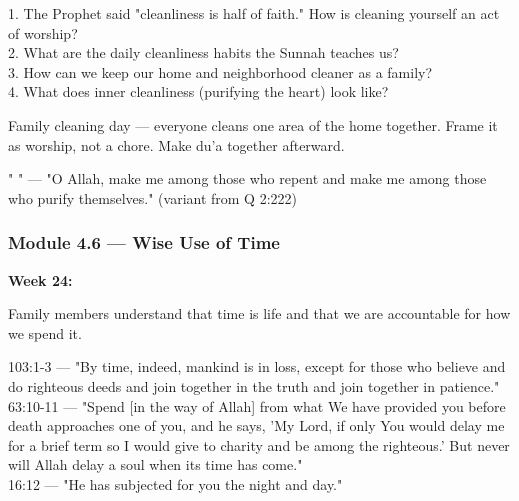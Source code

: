 \documentclass[11pt,a4paper]{article}
\begin{document}
\begin{discussionbox} 1. The Prophet said "cleanliness is half of faith." How is cleaning yourself an act of worship? \\ 2. What are the daily cleanliness habits the Sunnah teaches us? \\ 3. How can we keep our home and neighborhood cleaner as a family? \\ 4. What does inner cleanliness (purifying the heart) look like? \end{discussionbox}

\begin{activitybox} Family cleaning day --- everyone cleans one area of the home together. Frame it as worship, not a chore. Make du'a together afterward. \end{activitybox}

\begin{duabox} "      " --- "O Allah, make me among those who repent and make me among those who purify themselves." (variant from Q 2:222) \end{duabox}

\vspace{6pt}\noindent{\color{border}\rule{\textwidth}{0.5pt}}\vspace{6pt}

\subsubsection*{Module 4.6 --- Wise Use of Time}
\textbf{Week 24:} 

\begin{outcomebox} Family members understand that time is life and that we are accountable for how we spend it. \end{outcomebox}

\begin{quranbox} 103:1-3 --- "By time, indeed, mankind is in loss, except for those who believe and do righteous deeds and join together in the truth and join together in patience." \\ 63:10-11 --- "Spend [in the way of Allah] from what We have provided you before death approaches one of you, and he says, 'My Lord, if only You would delay me for a brief term so I would give to charity and be among the righteous.' But never will Allah delay a soul when its time has come." \\ 16:12 --- "He has subjected for you the night and day." \end{quranbox}
\end{document}
